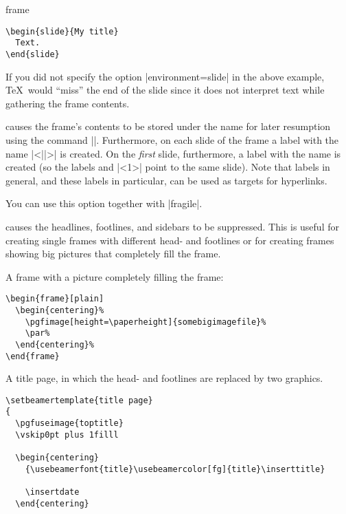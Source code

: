 \begin{environment}{{frame}%
    }
\begin{frame}[<+->][plain]
\begin{frame}
\begin{verbatim}
\begin{slide}{My title}
  Text.
\end{slide}
\end{verbatim}
    If you did not specify the option |environment=slide| in the above
    example, \TeX\ would ``miss'' the end of the slide since it does
    not interpret text while gathering the frame contents.
  \item
     causes the frame's contents to
    be stored under the name  for later resumption using
    the command |\againframe|. Furthermore, on each slide of the frame
    a label with the name |<||>| is created. On the
    \emph{first} slide, furthermore, a label with the name 
    is created (so the labels  and |<1>| point
    to the same slide). Note that labels in general, and these labels
    in particular, can be used as targets for hyperlinks.

    You can use this option together with |fragile|.
  \item
     causes  the headlines, footlines,
    and sidebars to be suppressed. This is useful for creating single
    frames with different head- and footlines or for creating frames
    showing big pictures that completely fill the frame.

  \example A frame with a picture completely filling the frame:
\begin{verbatim}
\begin{frame}[plain]
  \begin{centering}%
    \pgfimage[height=\paperheight]{somebigimagefile}%
    \par%
  \end{centering}%
\end{frame}
\end{verbatim}

  \example A title page, in which the head- and footlines are replaced
  by two graphics.
\begin{verbatim}
\setbeamertemplate{title page}
{
  \pgfuseimage{toptitle}
  \vskip0pt plus 1filll

  \begin{centering}
    {\usebeamerfont{title}\usebeamercolor[fg]{title}\inserttitle}

    \insertdate
  \end{centering}


\end{verbatim}
\end{frame}
\end{frame}
\end{environment}
